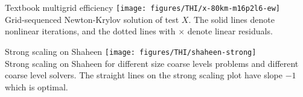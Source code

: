 \begin{frame}{Textbook multigrid efficiency}
  \texttt{[image: figures/THI/x-80km-m16p2l6-ew]} \\
  Grid-sequenced Newton-Krylov solution of test $X$.  The solid lines denote nonlinear iterations, and the dotted lines with $\times$ denote linear residuals.
\end{frame}

\begin{frame}{Strong scaling on Shaheen}
  \centering
  \texttt{[image: figures/THI/shaheen-strong]} \\
  Strong scaling on Shaheen for different size coarse levels problems and different coarse level solvers.
  The straight lines on the strong scaling plot have slope $-1$ which is optimal.
\end{frame}

